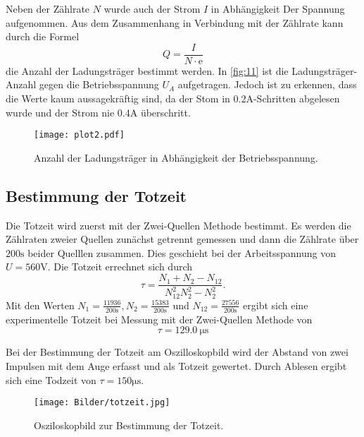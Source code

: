 \noindent Neben der Zählrate $N$ wurde auch der Strom $I$ in Abhängigkeit 
Der Spannung aufgenommen. Aus dem Zusammenhang in Verbindung 
mit der Zählrate kann durch die Formel 
\begin{equation}
    Q = \frac{I}{N \cdot \text{e}}
\end{equation}
die Anzahl der Ladungsträger bestimmt werden. In \autoref{fig:11} ist die 
Ladungsträger-Anzahl gegen die Betriebsspannung $U_A$ aufgetragen. Jedoch ist 
zu erkennen, dass die Werte kaum aussagekräftig sind, da der Stom 
in $0.2 \unit{\ampere}$-Schritten abgelesen wurde und der Strom 
nie $0.4 \unit{\ampere}$ überschritt.
\begin{figure}[H]
    \centering
    \caption{Anzahl der Ladungsträger in Abhängigkeit der Betriebsspannung.}
    \label{fig:11}
    \texttt{[image: plot2.pdf]}
\end{figure}

\subsection{Bestimmung der Totzeit}
Die Totzeit wird zuerst mit der Zwei-Quellen Methode bestimmt. Es 
werden die Zählraten zweier Quellen zunächst getrennt gemessen und 
dann die Zählrate über $200 \unit{\second}$ beider Quelllen zusammen. Dies
geschieht bei der Arbeitsspannung von $U = 560 \unit{\volt}$. Die Totzeit
errechnet sich durch
\begin{equation}
    \tau = \frac{N_\text{1} + N_\text{2} - N_\text{12}}{N_\text{12}^2  N_\text{2}^2 - N_\text{2}^2}.
\end{equation}
Mit den Werten $N_\text{1} = \frac{11936}{200\unit{\second}} , N_\text{2} =
\frac{15383}{200\unit{\second}} $ und $ N_\text{12} =
\frac{27556}{200\unit{\second}}$ ergibt sich eine 
experimentelle Totzeit bei Messung mit der Zwei-Quellen Methode von 
\begin{equation}
    \tau = \qty{129.0}{\micro\second} 
\end{equation}

Bei der Bestimmung der Totzeit am Oszilloskopbild wird der Abstand von zwei
Impulsen mit dem Auge erfasst und als Totzeit gewertet. Durch Ablesen ergibt
sich eine Todzeit von $\tau = 150 \unit{\micro\second}$.
\begin{figure}[H]
    \centering
    \caption{Osziloskopbild zur Bestimmung der Totzeit.}
    \label{fig:12}
    \texttt{[image: Bilder/totzeit.jpg]}
\end{figure} 


